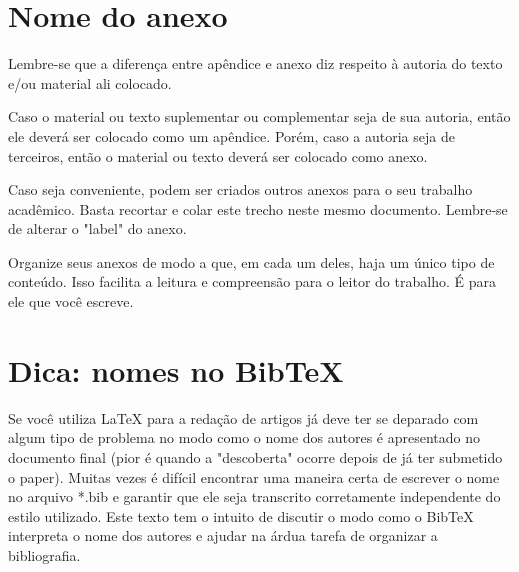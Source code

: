 

\begin{anexosenv}
\partanexos



\chapter{Nome do anexo}     %
\label{chap:anexoA}

Lembre-se que a diferença entre apêndice e anexo diz respeito à autoria do texto e/ou material ali colocado.

Caso o material ou texto suplementar ou complementar seja de sua autoria, então ele deverá ser colocado como um apêndice. Porém, caso a autoria seja de terceiros, então o material ou texto deverá ser colocado como anexo.

Caso seja conveniente, podem ser criados outros anexos para o seu trabalho acadêmico. Basta recortar e colar este trecho neste mesmo documento. Lembre-se de alterar o "label"{} do anexo.

Organize seus anexos de modo a que, em cada um deles, haja um único tipo de conteúdo. Isso facilita a leitura e compreensão para o leitor do trabalho. É para ele que você escreve.



\chapter{Dica: nomes no BibTeX}
\label{chap:anexoB}

Se você utiliza LaTeX para a redação de artigos já deve ter se deparado com algum tipo de problema no modo como o nome dos autores é apresentado no documento final (pior é quando a "descoberta"{} ocorre depois de já ter submetido o paper). Muitas vezes é difícil encontrar uma maneira certa de escrever o nome no arquivo *.bib e garantir que ele seja transcrito corretamente independente do estilo utilizado. Este texto tem o intuito de discutir o modo como o BibTeX interpreta o nome dos autores e ajudar na árdua tarefa de organizar a bibliografia.


\end{anexosenv}
